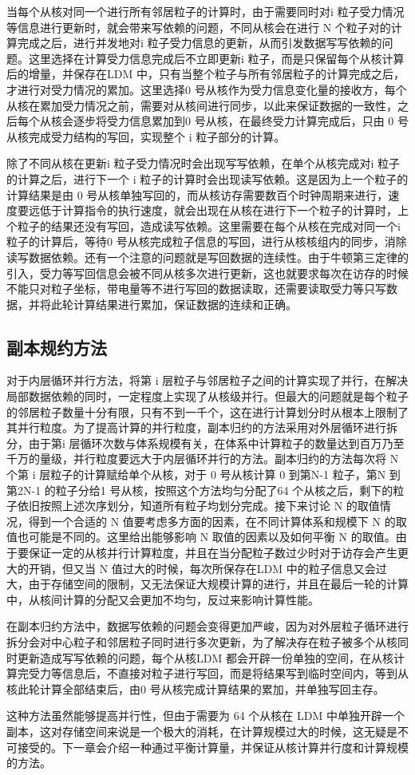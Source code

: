 当每个从核对同一个进行所有邻居粒子的计算时，由于需要同时对i 粒子受力情况等信息进行更新时，就会带来写依赖的问题，不同从核会在进行 N 个粒子对的计算完成之后，进行并发地对i 粒子受力信息的更新，从而引发数据写写依赖的问题。这里选择在计算受力信息完成后不立即更新i 粒子，而是只保留每个从核计算后的增量，并保存在LDM 中，只有当整个粒子与所有邻居粒子的计算完成之后，才进行对受力情况的累加。这里选择0 号从核作为受力信息变化量的接收方，每个从核在累加受力情况之前，需要对从核间进行同步，以此来保证数据的一致性，之后每个从核会逐步将受力信息累加到0 号从核，在最终受力计算完成后，只由 0 号从核完成受力结构的写回，实现整个 i 粒子部分的计算。

除了不同从核在更新i 粒子受力情况时会出现写写依赖，在单个从核完成对i 粒子的计算之后，进行下一个 i 粒子的计算时会出现读写依赖。这是因为上一个粒子的计算结果是由 0 号从核单独写回的，而从核访存需要数百个时钟周期来进行，速度要远低于计算指令的执行速度，就会出现在从核在进行下一个粒子的计算时，上个粒子的结果还没有写回，造成读写依赖。这里需要在每个从核在完成对同一个i 粒子的计算后，等待0 号从核完成粒子信息的写回，进行从核核组内的同步，消除读写数据依赖。还有一个注意的问题就是写回数据的连续性。由于牛顿第三定律的引入，受力等写回信息会被不同从核多次进行更新，这也就要求每次在访存的时候不能只对粒子坐标，带电量等不进行写回的数据读取，还需要读取受力等只写数据，并将此轮计算结果进行累加，保证数据的连续和正确。

\subsection{副本规约方法}
对于内层循环并行方法，将第 i 层粒子与邻居粒子之间的计算实现了并行，在解决局部数据依赖的同时，一定程度上实现了从核级并行。但最大的问题就是每个粒子的邻居粒子数量十分有限，只有不到一千个，这在进行计算划分时从根本上限制了其并行粒度。为了提高计算的并行粒度，副本归约的方法采用对外层循环进行拆分，由于第i 层循环次数与体系规模有关，在体系中计算粒子的数量达到百万乃至千万的量级，并行粒度要远大于内层循环并行的方法。副本归约的方法每次将 N 个第 i 层粒子的计算赋给单个从核，对于 0 号从核计算 0 到第N-1 粒子，第N 到第2N-1 的粒子分给1 号从核，按照这个方法均匀分配了64 个从核之后，剩下的粒子依旧按照上述次序划分，知道所有粒子均划分完成。接下来讨论 N 的取值情况，得到一个合适的 N 值要考虑多方面的因素，在不同计算体系和规模下 N 的取值也可能是不同的。这里给出能够影响 N 取值的因素以及如何平衡 N 的取值。由于要保证一定的从核并行计算粒度，并且在当分配粒子数过少时对于访存会产生更大的开销，但又当 N 值过大的时候，每次所保存在LDM 中的粒子信息又会过大，由于存储空间的限制，又无法保证大规模计算的进行，并且在最后一轮的计算中，从核间计算的分配又会更加不均匀，反过来影响计算性能。

在副本归约方法中，数据写依赖的问题会变得更加严峻，因为对外层粒子循环进行拆分会对中心粒子和邻居粒子同时进行多次更新，为了解决存在粒子被多个从核同时更新造成写写依赖的问题，每个从核LDM 都会开辟一份单独的空间，在从核计算完受力等信息后，不直接对粒子进行写回，而是将结果写到临时空间内，等到从核此轮计算全部结束后，由0 号从核完成计算结果的累加，并单独写回主存。

这种方法虽然能够提高并行性，但由于需要为 64 个从核在 LDM 中单独开辟一个副本，这对存储空间来说是一个极大的消耗，在计算规模过大的时候，这无疑是不可接受的。下一章会介绍一种通过平衡计算量，并保证从核计算并行度和计算规模的方法。


